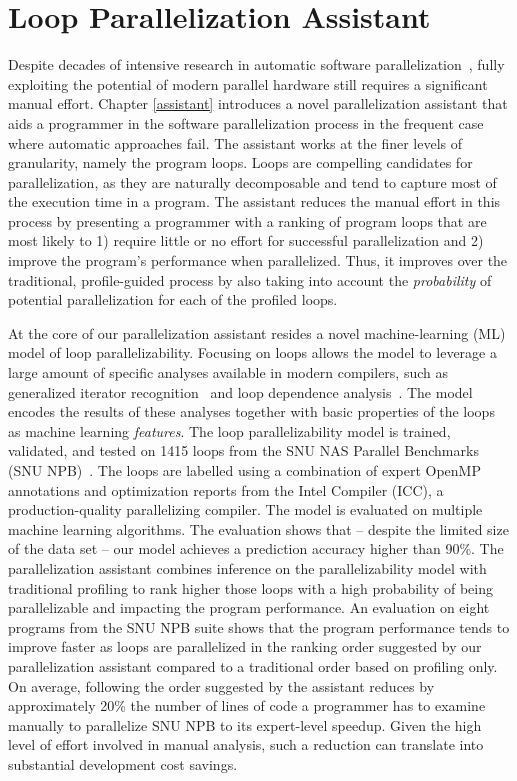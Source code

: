 \section{Loop Parallelization Assistant}
\label{introduction_assistant}
\quad Despite decades of intensive research in automatic software
parallelization~\cite{6813266}, fully exploiting the potential of modern parallel hardware still requires a significant manual effort. Chapter \ref{assistant} introduces a novel parallelization assistant that aids a programmer in the software parallelization process in the frequent case where automatic approaches fail. The assistant works at the finer levels of granularity, namely the program loops. Loops are compelling candidates for parallelization, as they are naturally decomposable and tend to capture most of the execution time in a program. The assistant reduces the manual effort in this process by presenting a programmer with a ranking of program loops that are most likely to 1) require little or no effort for successful parallelization and 2) improve the program's performance when parallelized. Thus, it improves over the traditional, profile-guided process by also taking into account the \emph{probability} of potential parallelization for each of the profiled loops.

At the core of our parallelization assistant resides a novel machine-learning (ML) model of loop parallelizability. Focusing on loops allows the model to leverage a large amount of specific analyses available in modern compilers, such as generalized iterator recognition~\cite{Manilov:2018:GPI:3178372.3179511} and loop dependence analysis~\cite{Jensen:2017:ILD:3132652.3095754}. The model encodes the results of these analyses together with basic properties of the loops as machine learning \textit{features}. The loop parallelizability model is trained, validated, and tested on 1415 loops from the SNU NAS Parallel Benchmarks (SNU NPB)~\cite{Seo:2011:PCN:2357490.2358063}. The loops are labelled using a combination of expert OpenMP~\cite{Dagum:1998:OIA:615255.615542} annotations and optimization reports from the Intel \cpp{} Compiler (ICC), a
production-quality parallelizing compiler. The model is evaluated on multiple machine learning algorithms. The evaluation shows that -- despite the limited size of the data set -- our model achieves a prediction accuracy higher than 90\%.\newline\null
\quad The parallelization assistant combines inference on the parallelizability model with traditional profiling to rank higher those loops with a high probability of being parallelizable and impacting the program performance. An evaluation on eight programs from the SNU NPB suite shows that the program performance tends to improve faster as loops are parallelized in the ranking order suggested by our parallelization assistant compared to a traditional order based on profiling only. On average, following the order suggested by the assistant reduces by approximately 20\% the number of lines of code a programmer has to examine manually to parallelize SNU NPB to its expert-level speedup. Given the high level of effort involved in manual analysis, such a reduction can translate into substantial development cost savings.

